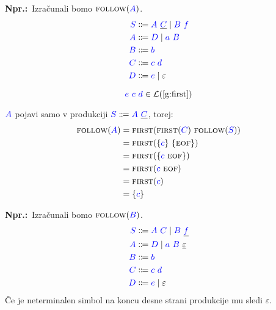 \documentclass{article}
\newcommand{\Ex}{\textbf{Npr.:}\ }
\newcommand{\FIRST}{\textsc{first}}
\newcommand{\FOLLOW}{\textsc{follow}}
\newcommand{\EOF}{\textsc{eof}}
\newcommand{\Symbol}[1]{\textcolor{blue}{#1}}
\newcommand{\Null}{\varepsilon}
\newcommand{\Language}[1]{\mathcal{L}(#1)}
\newcommand{\MathRef}[1]{\text{\ref{#1}}}
\newcommand{\Arrow}{\Coloneq}
\newcommand{\Seq}{\ }
\newcommand{\Union}{\mathrel{|}}
\begin{document}
\Ex Izračunali bomo $\FOLLOW(\Symbol{A})$.
\begin{equation*}
  \begin{aligned}
    \Symbol{S} &\Arrow \Symbol{A} \Seq \underline{\Symbol{C}} \Union \Symbol{B} \Seq \Symbol{f} \\
    \Symbol{A} &\Arrow \Symbol{D} \Union \Symbol{a} \Seq \Symbol{B} \\
    \Symbol{B} &\Arrow \Symbol{b}\\
    \Symbol{C} &\Arrow \Symbol{c} \Seq \Symbol{d}\\
    \Symbol{D} &\Arrow \Symbol{e} \Union \Null
  \end{aligned}
\end{equation*}

\begin{equation*}
  \Symbol{e} \Seq \Symbol{c} \Seq \Symbol{d} \in \Language{\MathRef{g:first}}
\end{equation*}

$\Symbol{A}$ pojavi samo v produkciji $\Symbol{S} \Arrow \Symbol{A} \Seq \underline{\Symbol{C}}$, torej:
\begin{align*}
  \FOLLOW(\Symbol{A}) &= \FIRST(\FIRST(\Symbol{C}) \Seq \FOLLOW(\Symbol{S})) \\
             &= \FIRST(\{\Symbol{c}\} \Seq \{\EOF\})\\
             &= \FIRST(\{\Symbol{c} \Seq \EOF\})\\
             &= \FIRST(\Symbol{c} \Seq \EOF) \\
             &= \FIRST(\Symbol{c}) \\
             &= \{\Symbol{c}\}
\end{align*}

\Ex Izračunali bomo $\FOLLOW(\Symbol{B})$.
\begin{equation*}
  \begin{aligned}
    \Symbol{S} &\Arrow \Symbol{A} \Seq \Symbol{C} \Union \Symbol{B} \Seq \underline{\Symbol{f}} \\
    \Symbol{A} &\Arrow \Symbol{D} \Union \Symbol{a} \Seq \Symbol{B} \Seq \underline{\Null} \\
    \Symbol{B} &\Arrow \Symbol{b}\\
    \Symbol{C} &\Arrow \Symbol{c} \Seq \Symbol{d}\\
    \Symbol{D} &\Arrow \Symbol{e} \Union \Null
  \end{aligned}
\end{equation*}
Če je neterminalen simbol na koncu desne strani produkcije mu sledi $\Null$.
\end{document}
